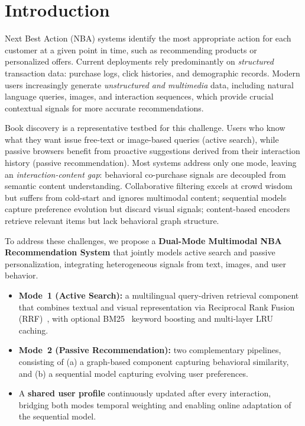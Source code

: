 \section{Introduction}
\label{sec:intro}

Next Best Action (NBA) systems identify the most appropriate action for each
customer at a given point in time, such as recommending products or
personalized offers.
Current deployments rely predominantly on \emph{structured} transaction data:
purchase logs, click histories, and demographic records.
Modern users increasingly generate \emph{unstructured and multimedia} data,
including natural language queries, images, and interaction sequences, which
provide crucial contextual signals for more accurate recommendations.

Book discovery is a representative testbed for this challenge.
Users who know what they want issue free-text or image-based queries
(active search), while passive browsers benefit from proactive suggestions
derived from their interaction history (passive recommendation).
Most systems address only one mode, leaving an \emph{interaction-content gap}:
behavioral co-purchase signals are decoupled from semantic content understanding.
Collaborative filtering excels at crowd wisdom but suffers from cold-start
and ignores multimodal content; sequential models~\cite{kang2018self} capture
preference evolution but discard visual signals; content-based encoders retrieve
relevant items but lack behavioral graph structure.

To address these challenges, we propose a \textbf{Dual-Mode Multimodal NBA Recommendation System} that jointly models active search and passive personalization, integrating heterogeneous signals from text, images, and user behavior.
\begin{itemize}
  \item \textbf{Mode~1 (Active Search):}  a multilingual query-driven
        retrieval component that combines textual and visual representation via Reciprocal Rank Fusion (RRF)~\cite{cormack2009rrf}, with optional BM25~\cite{robertson1994okapi} keyword boosting and multi-layer LRU caching.
  \item \textbf{Mode~2 (Passive Recommendation):} two complementary pipelines, consisting of (a) a graph-based component capturing behavioral similarity, and (b) a sequential model capturing evolving user preferences.
  \item A \textbf{shared user profile} continuously updated after every
        interaction, bridging both modes  temporal weighting and
        enabling online adaptation of the sequential model.
\end{itemize}


